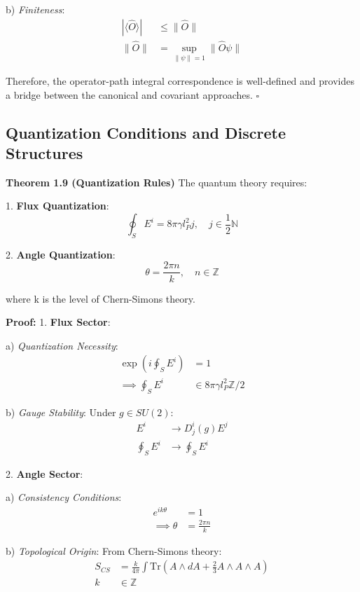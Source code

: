 \documentclass[12pt,a4paper]{article}
\begin{document}
   b) \textit{Finiteness}:
      \[
      \begin{aligned}
      |\langle\hat{O}\rangle| &\leq \|\hat{O}\| \\
      \|\hat{O}\| &= \sup_{\|\psi\|=1} \|\hat{O}\psi\|
      \end{aligned}
      \]

Therefore, the operator-path integral correspondence is well-defined and provides a bridge between the canonical and covariant approaches. $\square$

\subsection{Quantization Conditions and Discrete Structures}

\textbf{Theorem 1.9 (Quantization Rules)}
The quantum theory requires:

1. \textbf{Flux Quantization}:
   \[
   \oint_S E^i = 8\pi\gamma l_P^2 j, \quad j \in \frac{1}{2}\mathbb{N}
   \]

2. \textbf{Angle Quantization}:
   \[
   \theta = \frac{2\pi n}{k}, \quad n \in \mathbb{Z}
   \]

where k is the level of Chern-Simons theory.

\textbf{Proof:}
1. \textbf{Flux Sector}:
   
   a) \textit{Quantization Necessity}:
      \[
      \begin{aligned}
      \exp(i\oint_S E^i) &= 1 \\
      \implies \oint_S E^i &\in 8\pi\gamma l_P^2\mathbb{Z}/2
      \end{aligned}
      \]
   
   b) \textit{Gauge Stability}:
      Under $g \in SU(2)$:
      \[
      \begin{aligned}
      E^i &\rightarrow D^i_j(g)E^j \\
      \oint_S E^i &\rightarrow \oint_S E^i
      \end{aligned}
      \]

2. \textbf{Angle Sector}:
   
   a) \textit{Consistency Conditions}:
      \[
      \begin{aligned}
      e^{ik\theta} &= 1 \\
      \implies \theta &= \frac{2\pi n}{k}
      \end{aligned}
      \]
   
   b) \textit{Topological Origin}:
      From Chern-Simons theory:
      \[
      \begin{aligned}
      S_{CS} &= \frac{k}{4\pi}\int \text{Tr}(A\wedge dA + \frac{2}{3}A\wedge A\wedge A) \\
      k &\in \mathbb{Z}
      \end{aligned}
      \]
\end{document}
